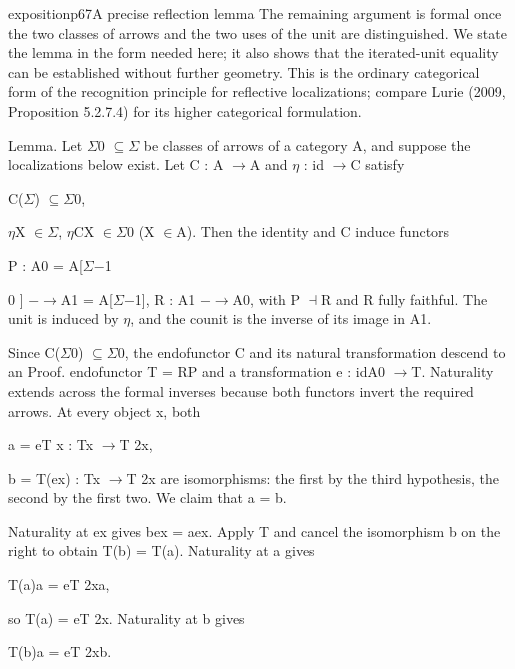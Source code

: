 \begin{dcomment}{exposition}{p67}{A precise reflection lemma}
The remaining argument is formal once the two classes of arrows and the two uses of the unit are distinguished. We state the lemma in the form needed here; it also shows that the iterated-unit equality can be established without further geometry. This is the ordinary categorical form of the recognition principle for reflective localizations; compare Lurie (2009, Proposition 5.2.7.4) for its higher categorical formulation.

Lemma. Let \ensuremath{\Sigma}0 \ensuremath{\subseteq}\ensuremath{\Sigma} be classes of arrows of a category A, and suppose the localizations below exist. Let C : A \ensuremath{\to}A and \ensuremath{\eta} : id \ensuremath{\to}C satisfy

C(\ensuremath{\Sigma}) \ensuremath{\subseteq}\ensuremath{\Sigma}0,

\ensuremath{\eta}X \ensuremath{\in}\ensuremath{\Sigma}, \ensuremath{\eta}CX \ensuremath{\in}\ensuremath{\Sigma}0 (X \ensuremath{\in}A). Then the identity and C induce functors

P : A0 = A[\ensuremath{\Sigma}\ensuremath{-}1

0 ] \ensuremath{-}\ensuremath{\to}A1 = A[\ensuremath{\Sigma}\ensuremath{-}1], R : A1 \ensuremath{-}\ensuremath{\to}A0, with P \ensuremath{\dashv}R and R fully faithful. The unit is induced by \ensuremath{\eta}, and the counit is the inverse of its image in A1.

Since C(\ensuremath{\Sigma}0) \ensuremath{\subseteq}\ensuremath{\Sigma}0, the endofunctor C and its natural transformation descend to an Proof. endofunctor T = RP and a transformation e : idA0 \ensuremath{\to}T. Naturality extends across the formal inverses because both functors invert the required arrows. At every object x, both

a = eT x : Tx \ensuremath{\to}T 2x,

b = T(ex) : Tx \ensuremath{\to}T 2x are isomorphisms: the first by the third hypothesis, the second by the first two. We claim that a = b.

Naturality at ex gives bex = aex. Apply T and cancel the isomorphism b on the right to obtain T(b) = T(a). Naturality at a gives

T(a)a = eT 2xa,

so T(a) = eT 2x. Naturality at b gives

T(b)a = eT 2xb.


\end{dcomment}

